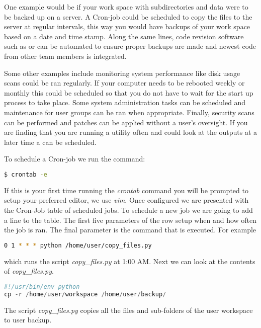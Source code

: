 One example would be if your work space with subdirectories and data were to be backed up on a server. A Cron-job could be scheduled to copy the files to the server at regular intervals, this way you would have backups of your work space based on a date and time stamp. Along the same lines, code revision software such as \emph{} or \emph{} can be automated to ensure proper backups are made and newest code from other team members is integrated.  

Some other examples include monitoring system performance like disk usage scans could be ran regularly. If your computer needs to be rebooted weekly or monthly this could be scheduled so that you do not have to wait for the start up process to take place. Some system administration tasks can be scheduled and maintenance for user groups can be ran when appropriate. Finally, security scans can be performed and patches can be applied without a user's oversight. If you are finding that you are running a utility often and could look at the outputs at a later time a  can be scheduled. 

To schedule a Cron-job we run the command:

\begin{lstlisting}[language=bash]
   $ crontab -e
\end{lstlisting}
	
If this is your first time running the \emph{crontab} command you will be prompted to setup your preferred editor, we use \emph{vim}. Once configured we are presented with the Cron-Job table of scheduled jobs. To schedule a new job we are going to add a line to the table. The first five parameters of the row setup when and how often the job is ran. The final parameter is the command that is executed. For example 

\begin{lstlisting}[language=bash]
    0 1 * * * python /home/user/copy_files.py
\end{lstlisting}

which runs the  script \emph{copy\_files.py} at 1:00 AM. Next we can look at the contents of \emph{copy\_files.py}. 

\begin{lstlisting}[language=python]
#!/usr/bin/env python
cp -r /home/user/workspace /home/user/backup/
\end{lstlisting}

The  script \emph{copy\_files.py} copies all the files and sub-folders of the user workspace to user backup. 
	
